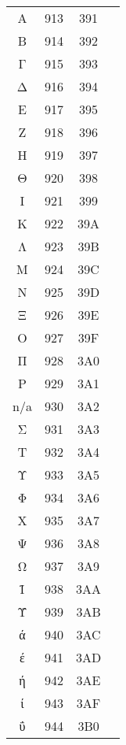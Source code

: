 \documentclass[10pt]{article}
\begin{document}
\begin{tabular}{crcl}
Α&913&391&\\
Β&914&392&\\
Γ&915&393&\\
Δ&916&394&\\
Ε&917&395&\\
Ζ&918&396&\\
Η&919&397&\\
Θ&920&398&\\
Ι&921&399&\\
Κ&922&39A&\\
Λ&923&39B&\\
Μ&924&39C&\\
Ν&925&39D&\\
Ξ&926&39E&\\
Ο&927&39F&\\
Π&928&3A0&\\
Ρ&929&3A1&\\
n/a&930&3A2&\\
Σ&931&3A3&\\
Τ&932&3A4&\\
Υ&933&3A5&\\
Φ&934&3A6&\\
Χ&935&3A7&\\
Ψ&936&3A8&\\
Ω&937&3A9&\\
Ϊ&938&3AA&\\
Ϋ&939&3AB&\\
ά&940&3AC&\\
έ&941&3AD&\\
ή&942&3AE&\\
ί&943&3AF&\\
ΰ&944&3B0&\\
\end{tabular}
\end{document}

